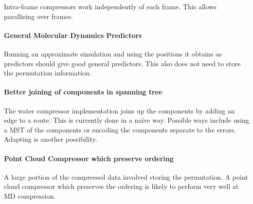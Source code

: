\documentclass[a4paper]{report}
\begin{document}
Intra-frame compressors work independently of each frame. This allows
parallising over frames.

\paragraph{General Molecular Dynamics Predictors}

Running an approximate simulation and using the positions it obtains as
predictors should give good general predictors. This also does not need to
store the permutation information.

\paragraph{Better joining of components in spanning tree}

The water compressor implementation joins up the components by adding an edge
to a route. This is currently done in a na\"{i}ve way. Possible ways include
using a MST of the components or encoding the components separate to the
errors. Adapting \citet{chen2005lcp} is another possibility.

\paragraph{Point Cloud Compressor which preserve ordering}

A large portion of the compressed data involved storing the permutation. A
point cloud compressor which preserves the ordering is likely to perform very
well at MD compression.

\nocite{*}

\end{document}
